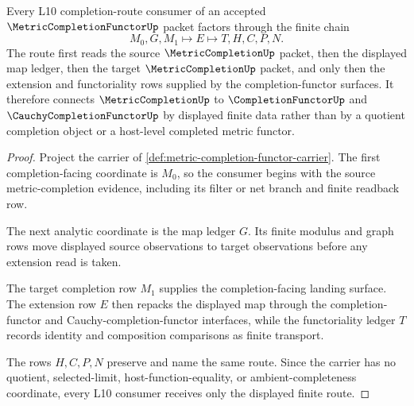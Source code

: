 \begin{theorem}
\label{thm:metric-completion-functor-route}
Every L10 completion-route consumer of an accepted $\MetricCompletionFunctorUp$ packet factors through the finite chain
$$
M_0,G,M_1 \longmapsto E \longmapsto T,H,C,P,N .
$$
The route first reads the source $\MetricCompletionUp$ packet, then the displayed map ledger, then the target $\MetricCompletionUp$ packet, and only then the extension and functoriality rows supplied by the completion-functor surfaces. It therefore connects $\MetricCompletionUp$ to $\CompletionFunctorUp$ and $\CauchyCompletionFunctorUp$ by displayed finite data rather than by a quotient completion object or a host-level completed metric functor.
\end{theorem}
\begin{proof}
Project the carrier of \autoref{def:metric-completion-functor-carrier}. The first completion-facing coordinate is $M_0$, so the consumer begins with the source metric-completion evidence, including its filter or net branch and finite readback row.

The next analytic coordinate is the map ledger $G$. Its finite modulus and graph rows move displayed source observations to target observations before any extension read is taken.

The target completion row $M_1$ supplies the completion-facing landing surface. The extension row $E$ then repacks the displayed map through the completion-functor and Cauchy-completion-functor interfaces, while the functoriality ledger $T$ records identity and composition comparisons as finite transport.

The rows $H,C,P,N$ preserve and name the same route. Since the carrier has no quotient, selected-limit, host-function-equality, or ambient-completeness coordinate, every L10 consumer receives only the displayed finite route.
\end{proof}

